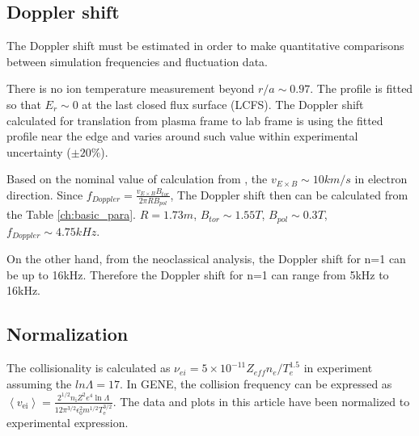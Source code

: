 \documentclass[
 aip,
 amsmath,amssymb,
 reprint
]{revtex4-1}
\begin{document}
\subsection{Doppler shift}
The Doppler shift must be estimated in order to make quantitative comparisons between simulation frequencies and fluctuation data.

There is no ion temperature measurement beyond $r/a\sim0.97$. The profile is fitted so that $E_r\sim0$ at the last closed flux surface (LCFS). The Doppler shift calculated for translation from plasma frame to lab frame is using the fitted profile near the edge and varies around such value within experimental uncertainty ($\pm 20\%$). 

Based on the nominal value of calculation from \cite{RIP_Chen_POP_2021}, the $v_{E\times B}\sim 10km/s$ in electron direction. Since $f_{Doppler}=\frac{v_{E\times B} B_{tor} }{2\pi R B_{pol} }$, The Doppler shift then can be calculated from the Table \ref{ch:basic_para}.  $R=1.73m$, $B_{tor}\sim1.55T$, $B_{pol}\sim0.3T$, $f_{Doppler}\sim4.75kHz$. 

On the other hand, from the neoclassical analysis, the Doppler shift for n=1 can be up to 16kHz. Therefore the Doppler shift for n=1 can range from 5kHz to 16kHz. %

\subsection{Normalization}

The collisionality is calculated as $\nu_{ei}=5 \times 10^{-11} Z_{e f f} n_{e} / T_{e}^{1.5}$ in experiment\cite{RIP_Chen_POP_2021} assuming the $ln\Lambda=17$. In GENE, the collision frequency can be expressed as $\left\langle v_{\mathrm{ei}}\right\rangle=\frac{2^{1 / 2} n_{\mathrm{i}} Z^{2} e^{4} \ln \Lambda}{12 \pi^{3 / 2} \epsilon_{0}^{2} m^{1 / 2} T_{\mathrm{e}}^{3 / 2}}$. \cite{Goldstone} The data and plots in this article have been normalized to experimental expression.


\medskip
 
\nocite{*}

\end{document}
